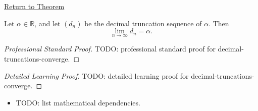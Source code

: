 \newpage
{}
\label{prf:decimal-truncations-converge}

\begin{remark*}[Return]
\hyperref[thm:decimal-truncations-converge]{Return to Theorem}
\end{remark*}

\begin{theorem*}
Let $\alpha\in\mathbb{R}$, and let $(d_n)$ be the decimal truncation
sequence of $\alpha$. Then
\[
  \lim_{n\to\infty}d_n=\alpha.
\]

\smallskip
\noindent
\end{theorem*}

\begin{proof}[Professional Standard Proof]
\LRAProofBodyStart
TODO: professional standard proof for decimal-truncations-converge.
\end{proof}

\begin{proof}[Detailed Learning Proof]
\LRAProofBodyStart
TODO: detailed learning proof for decimal-truncations-converge.
\end{proof}

\begin{remark*}
\end{remark*}

\begin{dependencies}
\begin{itemize}
  \item TODO: list mathematical dependencies.
\end{itemize}
\end{dependencies}

\clearpage
